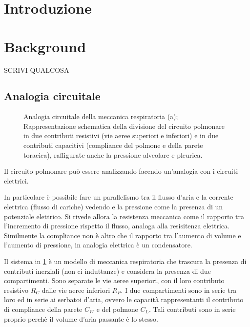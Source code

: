 \section{Introduzione}

\textcolor{blue}{
	\lipsum[1-2]
}

\section{Background}


SCRIVI QUALCOSA

\subsection{Analogia circuitale}

\begin{figure}[t!]
	\begin{subfigure}{0.5\linewidth}
		\centering
		\small{
			\def\svgwidth{\linewidth}
			}
		\caption{}
		\label{fig:modello}
	\end{subfigure}\hfill
	\begin{subfigure}{0.5\linewidth}
		\centering
		\small{
			\def\svgwidth{0.7\linewidth}
			}
		\caption{}
	\end{subfigure}\hfill
	\caption{Analogia circuitale della meccanica respiratoria \cite{khoo_physiological_2018} (a); Rappresentazione schematica della divisione del circuito polmonare in due contributi resistivi (vie aeree superiori e inferiori) e in due contributi capacitivi (compliance del polmone e della parete toracica), raffigurate anche la pressione alveolare e pleurica.}
\end{figure}

Il circuito polmonare può essere analizzando facendo un'analogia con i circuiti elettrici.

In particolare è possibile fare un parallelismo tra il flusso d'aria e la corrente elettrica (flusso di cariche) vedendo e la pressione come la presenza di un potenziale elettrico.
Si rivede allora la resistenza meccanica come il rapporto tra l'incremento di pressione rispetto il flusso, analoga alla resisitenza elettrica. Similmente la compliance non è altro che il rapporto tra l'aumento di volume e l'aumento di pressione, in analogia elettrica è un condensatore.

Il sistema in \cref{fig:modello} è un modello di meccanica respiratoria che trascura la presenza di contributi inerziali (non ci induttanze) e considera la presenza di due compartimenti. Sono separate le vie aeree superiori, con il loro contributo resistivo $R_C$ dalle vie aeree inferiori $R_P$. I due compartimenti sono in serie tra loro ed in serie ai serbatoi d'aria, ovvero le capacità rappresentanti il contributo di compliance della parete $C_W$ e del polmone $C_L$. 
Tali contributi sono in serie proprio perchè il volume d'aria passante è lo stesso. 

